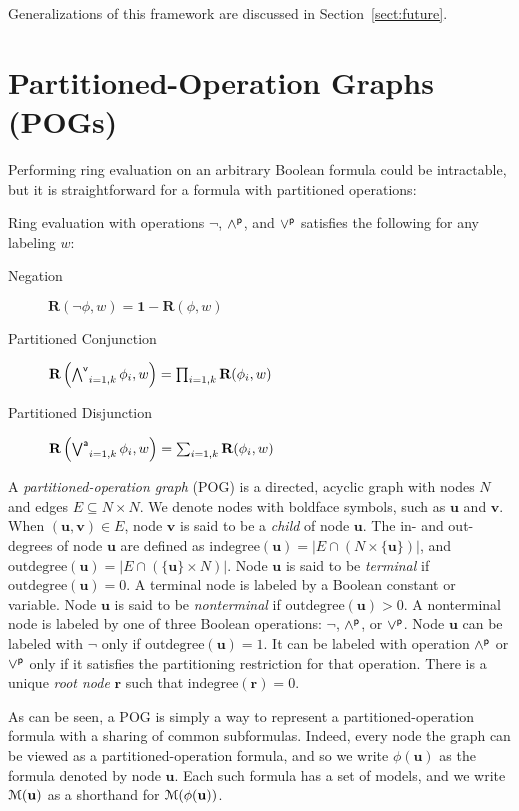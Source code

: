 \documentclass[letterpaper,USenglish,cleveref, autoref, thm-restate]{lipics-v2021}
\newcommand{\pand}{\mathbin{\land^{\sf p}}}
\newcommand{\por}{\mathbin{\lor^{\sf p}}}
\DeclareMathOperator*{\Pand}{\bigwedge^{\sf v}}
\DeclareMathOperator*{\Por}{\bigvee^{\sf a}}
\newcommand{\boolnot}{\neg}
\newcommand{\rep}{\textbf{R}}
\newcommand{\mulident}{\textbf{1}}
\newcommand{\modelset}{{\cal M}}
\newcommand{\indegree}{\textrm{indegree}}
\newcommand{\outdegree}{\textrm{outdegree}}
\newcommand{\makenode}[1]{\mathbf{#1}}
\newcommand{\nodeu}{\makenode{u}}
\newcommand{\nodev}{\makenode{v}}
\newcommand{\noder}{\makenode{r}}
\begin{document}
Generalizations of this framework are discussed in Section~\ref{sect:future}.

\section{Partitioned-Operation Graphs (POGs)}

Performing ring evaluation on an arbitrary Boolean formula could be intractable, but it is straightforward for a formula with partitioned operations:
\begin{proposition}
Ring evaluation with operations $\boolnot$, $\pand$, and $\por$ satisfies the following for any labeling $w$:
\begin{description}
\item[Negation] $\rep(\boolnot \phi, w) = \mulident - \rep(\phi, w)$
\item[Partitioned Conjunction] $\rep\left(\Pand_{i=1,k} \phi_i, w \right) = \prod_{i=1,k} \rep(\phi_i, w)$
\item[Partitioned Disjunction] $\rep\left(\Por_{i=1,k} \phi_i, w\right) = \sum_{i=1,k} \rep(\phi_i, w)$
\end{description}
\end{proposition}

A {\em partitioned-operation graph} (POG) is a directed, acyclic graph
with nodes $N$ and edges $E \subseteq N \times N$.  We denote nodes with boldface symbols, such as $\nodeu$ and $\nodev$.
When $(\nodeu,\nodev) \in E$,
node $\nodev$ is said to be a {\em child} of node $\nodeu$.
The in- and out-degrees of node $\nodeu$ are defined as $\indegree(\nodeu) = | E \cap (N \times \{\nodeu\}) |$, and
$\outdegree(\nodeu) = | E \cap (\{\nodeu\} \times N) |$.
Node $\nodeu$ is said to be {\em terminal} if $\outdegree(\nodeu) = 0$.  A terminal node is labeled by a Boolean constant or variable.
Node $\nodeu$ is said to be {\em nonterminal} if $\outdegree(\nodeu) > 0$.  A nonterminal node is labeled by one of three Boolean operations:
$\boolnot$, $\pand$, or $\por$.  Node $\nodeu$ can be labeled with $\boolnot$ only if $\outdegree(\nodeu) = 1$.
It can be labeled with operation $\pand$ or $\por$ only if it satisfies the partitioning restriction for that operation.
There is a unique {\em root node} $\noder$ such that $\indegree(\noder) = 0$.

As can be seen, a POG is simply a way to represent a partitioned-operation
formula with a sharing of common subformulas.  Indeed, every node the graph can be viewed as a partitioned-operation formula, and so we write
$\phi(\nodeu)$ as the formula denoted by node $\nodeu$.
Each such formula has a set of models, and we write $\modelset(\nodeu)$ as a shorthand for $\modelset(\phi(\nodeu))$.
\end{document}
